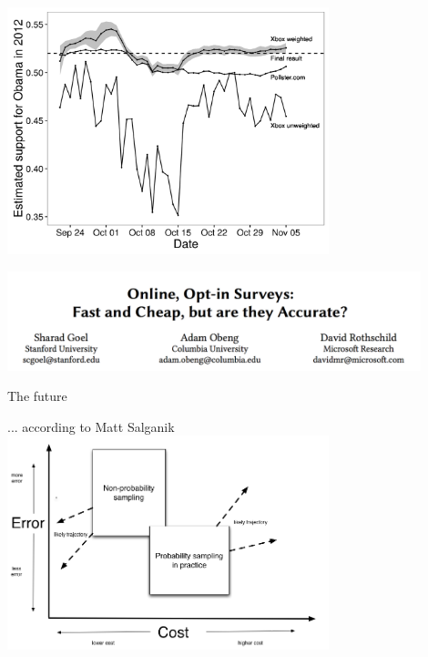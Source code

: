 \documentclass[aspectratio=169]{beamer}
\begin{document}
\begin{frame}

\begin{center}
\includegraphics[width=0.7\textwidth]{figures/bitbybit3-8_wang_forecasting_2015_fig2_and_3}
\end{center}

\end{frame}
\begin{frame}

\begin{center}
\includegraphics[width=0.9\textwidth]{figures/goel_online_2017_title}
\end{center}

\vfill
{}

\end{frame}
\begin{frame}{The future}

\begin{center}
... according to Matt Salganik
\vfill
\includegraphics[width=0.7\textwidth]{figures/future_sampling}
\end{center}

\end{frame}
\end{document}

